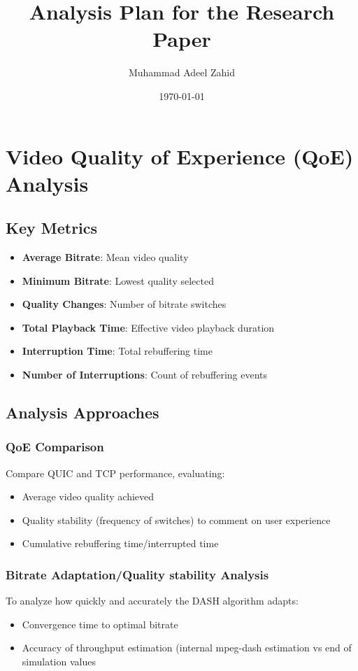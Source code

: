 \documentclass[11pt,a4paper]{article}
\title{Analysis Plan for the Research Paper}
\author{Muhammad Adeel Zahid}
\date{\today}
\begin{document}
\maketitle

\section{Video Quality of Experience (QoE) Analysis}

\subsection{Key Metrics}

\begin{itemize}
    \item \textbf{Average Bitrate}: Mean video quality 
    \item \textbf{Minimum Bitrate}: Lowest quality selected
    \item \textbf{Quality Changes}: Number of bitrate switches
    \item \textbf{Total Playback Time}: Effective video playback duration 
    \item \textbf{Interruption Time}: Total rebuffering time
    \item \textbf{Number of Interruptions}: Count of rebuffering events
    \end{itemize}
\subsection{Analysis Approaches}

\subsubsection{QoE Comparison}
Compare QUIC and TCP performance, evaluating:
\begin{itemize}
    \item Average video quality achieved
    \item Quality stability (frequency of switches) to comment on user experience
    \item Cumulative rebuffering time/interrupted time
\end{itemize}

\subsubsection{Bitrate Adaptation/Quality stability Analysis}
To analyze how quickly and accurately the DASH algorithm adapts:
\begin{itemize}
    \item Convergence time to optimal bitrate
    \item Accuracy of throughput estimation (internal mpeg-dash estimation vs end of simulation values
\end{itemize}
\end{document}
